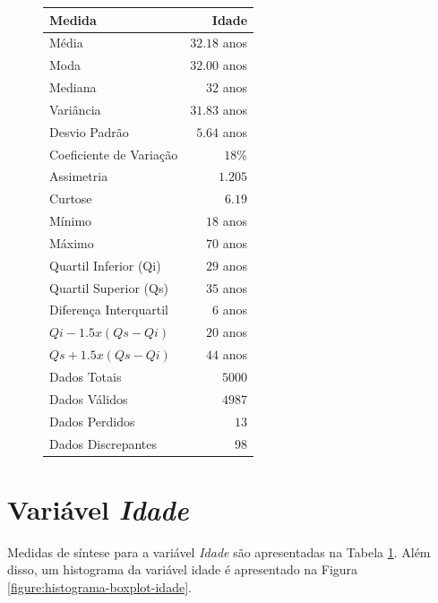 \documentclass[10pt,a4paper,oneside]{article}
\begin{document}
\begin{figure}
\begin{minipage}{0.49\textwidth}
\label{table: medidas sintese idade}
\begin{tabular}{l r}
	\toprule
	\textbf{Medida}               & \textbf{Idade} \\
	\midrule
	Média                         & $32.18$ anos   \\
	Moda                          & $32.00$ anos   \\
	Mediana                       & $32$ anos      \\
	Variância                     & $31.83$ anos   \\
	Desvio Padrão                 & $5.64$ anos    \\
	Coeficiente de Variação       & $18 \%$        \\
	Assimetria                    & $1.205$        \\
	Curtose                       & $6.19$         \\
	Mínimo                        & $18$ anos      \\
	Máximo                        & $70$ anos      \\
	Quartil Inferior (Qi)         & $29$ anos      \\
	Quartil Superior (Qs)         & $35$ anos      \\
	Diferença Interquartil        & $6$  anos      \\
	$Qi-1.5x(Qs-Qi)$              & $20$ anos      \\
	$Qs+1.5x(Qs-Qi)$              & $44$ anos      \\
	Dados Totais                  & $5000$         \\
	Dados Válidos                 & $4987$         \\
	Dados Perdidos                & $13$           \\
	Dados Discrepantes            & $98$           \\
	\bottomrule
\end{tabular}
\end{minipage}
\end{figure}

\FloatBarrier
\section{Variável \textit{Idade}}
\label{section:idade}

Medidas de síntese para a variável \textit{Idade} são apresentadas na Tabela \ref{table: medidas sintese idade}. Além disso, um histograma da variável idade é apresentado na Figura \ref{figure:histograma-boxplot-idade}.
\end{document}
